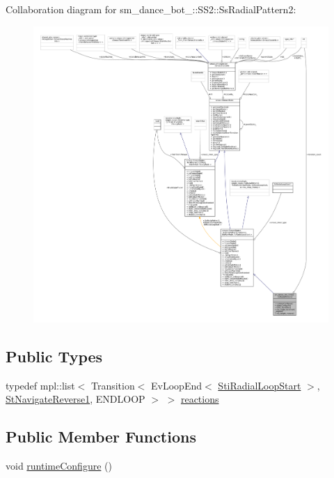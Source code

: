 Collaboration diagram for sm\+\_\+dance\+\_\+bot\+\_\+:\+:S\+S2\+:\+:Ss\+Radial\+Pattern2\+:
\nopagebreak
\begin{figure}[H]
\begin{center}
\leavevmode
\includegraphics[width=350pt]{structsm__dance__bot__3_1_1SS2_1_1SsRadialPattern2__coll__graph}
\end{center}
\end{figure}
\subsection*{Public Types}
\begin{DoxyCompactItemize}
\item 
typedef mpl\+::list$<$ Transition$<$ Ev\+Loop\+End$<$ \hyperlink{structsm__dance__bot__3_1_1radial__motion__states_1_1StiRadialLoopStart}{Sti\+Radial\+Loop\+Start} $>$, \hyperlink{structsm__dance__bot__3_1_1StNavigateReverse1}{St\+Navigate\+Reverse1}, E\+N\+D\+L\+O\+OP $>$ $>$ \hyperlink{structsm__dance__bot__3_1_1SS2_1_1SsRadialPattern2_a6f79f42441e01e2dbd5b08a772e500d7}{reactions}
\end{DoxyCompactItemize}
\subsection*{Public Member Functions}
\begin{DoxyCompactItemize}
\item 
void \hyperlink{structsm__dance__bot__3_1_1SS2_1_1SsRadialPattern2_a629d4d59f76d9d7a2b926d83a7d5ff09}{runtime\+Configure} ()
\end{DoxyCompactItemize}

